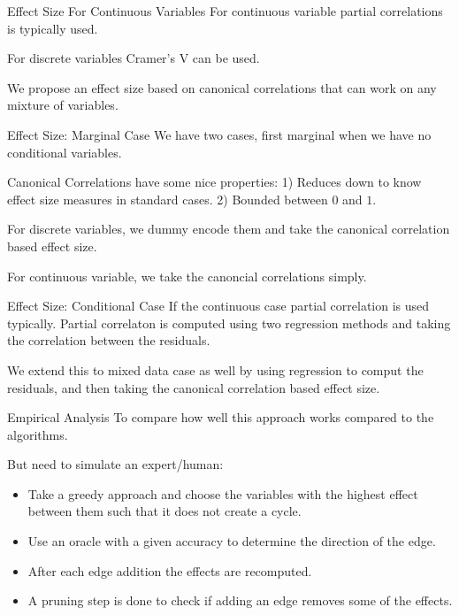 \documentclass{beamer}
\begin{document}
\begin{frame}{Effect Size For Continuous Variables}
	For continuous variable partial correlations is typically used.

	For discrete variables Cramer's V can be used.

	We propose an effect size based on canonical correlations that can work on any mixture of variables.
\end{frame}

\begin{frame}{Effect Size: Marginal Case}
	We have two cases, first marginal when we have no conditional variables.

	Canonical Correlations have some nice properties: 1) Reduces down to know effect size measures in standard cases. 2) Bounded between $ 0 $ and $ 1 $.

	For discrete variables, we dummy encode them and take the canonical correlation based effect size.

	For continuous variable, we take the canoncial correlations simply.
\end{frame}

\begin{frame}{Effect Size: Conditional Case}
	If the continuous case partial correlation is used typically. Partial correlaton is computed using two regression methods and taking the correlation between the residuals.

	We extend this to mixed data case as well by using regression to comput the residuals, and then taking the canonical correlation based effect size.
\end{frame}

\begin{frame}{Empirical Analysis}
	To compare how well this approach works compared to the algorithms.

	But need to simulate an expert/human:
	\begin{itemize}
		\item Take a greedy approach and choose the variables with the highest effect between them such that it does not create a cycle.
		\item Use an oracle with a given accuracy to determine the direction of the edge.
		\item After each edge addition the effects are recomputed.
		\item A pruning step is done to check if adding an edge removes some of the effects.
	\end{itemize}
\end{frame}
\end{document}
